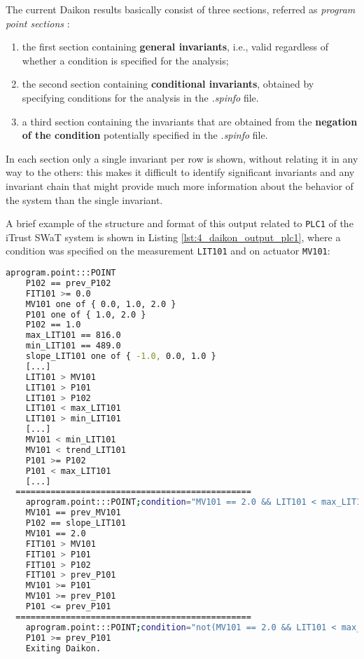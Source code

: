 \bigskip
The current Daikon results basically consist of three sections, referred as \textit{program point sections} \cite{daikon_program_point}:

\begin{enumerate}
	\item the first section containing \textbf{general invariants}, i.e., valid regardless of whether a condition is specified for the analysis;
	
	\item the second section containing \textbf{conditional invariants}, obtained by specifying conditions for the analysis in the \textit{.spinfo} file. 
	
	\item a third section containing the invariants that are obtained from the \textbf{negation of the condition} potentially specified in the \textit{.spinfo} file.
\end{enumerate}

In each section only a single invariant per row is shown, without relating it in any way to the others: this makes it difficult to identify significant invariants and any invariant chain that might provide much more information about the behavior of the system than the single invariant.

A brief example of the structure and format of this output related to \texttt{PLC1} of the iTrust SWaT system is shown in Listing \ref{lst:4_daikon_output_plc1}, where a condition was specified on the measurement \texttt{LIT101} and on actuator \texttt{MV101}: %

\begin{lstlisting}[language=bash,numbers=none,caption={Standard Daikon output for \texttt{PLC1} of the iTrust SWaT system},label=lst:4_daikon_output_plc1]
	aprogram.point:::POINT
	P102 == prev_P102
	FIT101 >= 0.0
	MV101 one of { 0.0, 1.0, 2.0 }
	P101 one of { 1.0, 2.0 }
	P102 == 1.0
	max_LIT101 == 816.0
	min_LIT101 == 489.0
	slope_LIT101 one of { -1.0, 0.0, 1.0 }
	[...]
	LIT101 > MV101
	LIT101 > P101
	LIT101 > P102
	LIT101 < max_LIT101
	LIT101 > min_LIT101
	[...]
	MV101 < min_LIT101
	MV101 < trend_LIT101
	P101 >= P102
	P101 < max_LIT101
	[...]
  ===============================================
	aprogram.point:::POINT;condition="MV101 == 2.0 && LIT101 < max_LIT101 - 16 && LIT101 > min_LIT101 + 15"
	MV101 == prev_MV101
	P102 == slope_LIT101
	MV101 == 2.0
	FIT101 > MV101
	FIT101 > P101
	FIT101 > P102
	FIT101 > prev_P101
	MV101 >= P101
	MV101 >= prev_P101
	P101 <= prev_P101
  ===============================================
	aprogram.point:::POINT;condition="not(MV101 == 2.0 && LIT101 < max_LIT101 - 16 && LIT101 > min_LIT101 + 15)"
	P101 >= prev_P101
	Exiting Daikon.
\end{lstlisting}

